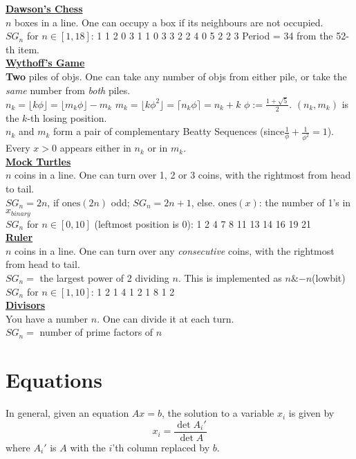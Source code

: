 	\underline{\textbf{Dawson's Chess}} \\
	$n$ boxes in a line. One can occupy a box if its neighbours are not occupied. \\
	$SG_n$ for $n\in [1,18]$: 1 1 2 0 3 1 1 0 3 3 2 2 4 0 5 2 2 3
	Period = 34 from the 52-th item.
	\\ 
	
	\underline{\textbf{Wythoff's Game}}\\
	 \textbf{Two} piles of objs. One can take any number of objs from either pile, or take the \emph{same} number from \emph{both} piles. \\
	$n_k = \lfloor k \phi \rfloor = \lfloor m_k \phi \rfloor -m_k$  $m_k = \lfloor k \phi^2 \rfloor = \lceil n_k \phi \rceil = n_k + k$  $\phi:=\frac{1+\sqrt{5}}{2}$. $(n_k,m_k)$ is the $k$-th losing position.\\
	$n_k$ and $m_k$ form a pair of complementary Beatty Sequences (since$\frac{1}{\phi}+\frac{1}{\phi^2}=1$). Every $x>0$ appears either in $n_k$ or in $m_k$.
	\\
	
	\underline{\textbf{Mock Turtles}}\\
	$n$ coins in a line. One can turn over 1, 2 or 3 coins, with the rightmost from head to tail. \\
	$SG_n = 2n$, if $\mathrm{ones}(2n)$ odd; $SG_n = 2n + 1$, else. $\mathrm{ones}(x)$: the number of 1's in $x_{binary}$\\
	$SG_n$ for $n\in [0,10]$ (leftmost position is 0): 1 2 4 7 8 11 13 14 16 19 21
	\\ 
	
	\underline{\textbf{Ruler}} \\
	$n$ coins in a line. One can turn over any \emph{consecutive} coins, with the rightmost from head to tail. \\
	$SG_n=$ the largest power of 2 dividing $n$. This is implemented as $n$\&$-n$(lowbit)\\
	$SG_n$ for $n\in [1,10]$: 1 2 1 4 1 2 1 8 1 2
	\\ 
	
	\underline{\textbf{Divisors}} \\
	You have a number $n$. One can divide it at each turn. \\
	$SG_n=$ number of prime factors of $n$
	\\ 

\section{Equations}
In general, given an equation $Ax = b$, the solution to a variable $x_i$ is given by
\[x_i = \frac{\det A_i'}{\det A} \]
where $A_i'$ is $A$ with the $i$'th column replaced by $b$.

